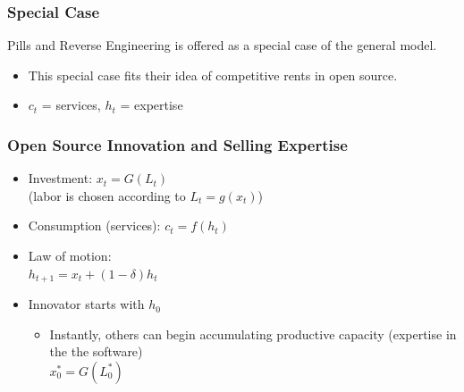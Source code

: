 \documentclass{beamer}
\begin{document}
\begin{frame}[t]\frametitle{Special Case}
	\vspace{5mm}
	Pills and Reverse Engineering is offered as a special case of the general model.
	\begin{itemize}
		\vspace{2mm}
		\item This special case fits their idea of competitive rents in open source.
		\vspace{2mm}
		\item $c_t$ = services, $h_t$ = expertise 
	\end{itemize}
\end{frame}

\begin{frame}[t]
  \frametitle{Open Source Innovation and Selling Expertise}
  \begin{itemize}
	  \vspace{2mm}
    \item<+-> Investment: $x_t = G(L_t)$\\ (labor is chosen according to $L_t = g(x_t)$)
	\vspace{2mm}
    \item<+-> Consumption (services): $c_t = f(h_t)$
	\vspace{2mm}
	\item<+-> Law of motion:\\
	\hspace{5mm}$h_{t+1} = x_t + (1-\delta)h_t$
	\vspace{2mm}
	\item<+-> Innovator starts with $h_0$
    \begin{itemize}
		\vspace{2mm}
      \item<+-> Instantly, others can begin accumulating productive capacity (expertise in the the software)\\
	  \vspace{2mm}
	  \hspace{25mm}$x_0^* = G(L_0^*)$
    \end{itemize}
  \end{itemize}
\end{frame}
\end{document}

